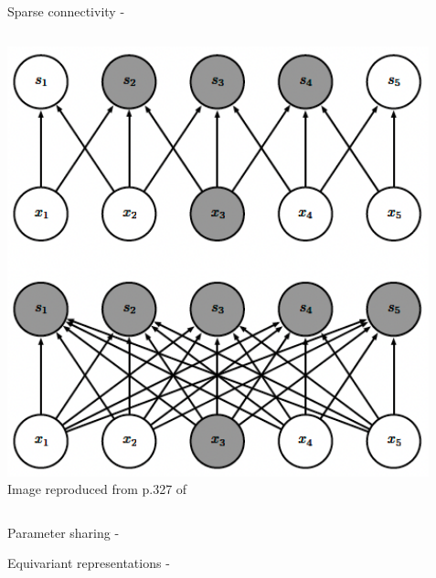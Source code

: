 \begin{frame}[t,allowframebreaks]{Sparse connectivity -}
    \begin{columns}
        \begin{column}{0.50\textwidth}
         \begin{center}
          \includegraphics[width=1.0\textwidth]
          {./images/cnn/sparse_connectivity/goodfellow17_sparse_connectivity_from_below_01.png}\\
          {\scriptsize \color{col:attribution} 
          Image reproduced from p.327 of \cite{Goodfellow:2017MITDL}}\\
         \end{center}
        \end{column}
        \begin{column}{0.50\textwidth}
        \end{column}
    \end{columns}

\end{frame}

%
%
%

\begin{frame}[t,allowframebreaks]{Parameter sharing -}

\end{frame}

%
%
%

\begin{frame}[t,allowframebreaks]{Equivariant representations -}

\end{frame}

